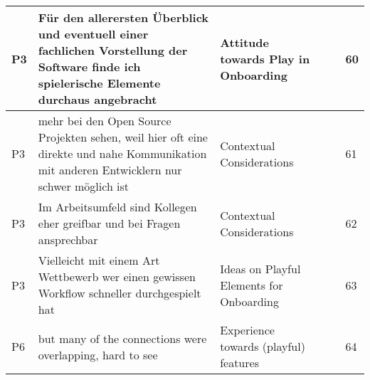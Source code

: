 \begin{appendices}
\begin{landscape}
\begin{longtable}{|p{0.8cm}|p{7cm}|p{3cm}|p{3cm}|p{5.5cm}|p{0.5cm}|}
      P3                   & Für den allerersten Überblick und eventuell einer fachlichen Vorstellung der Software finde ich spielerische Elemente durchaus angebracht                                                                                                                                   & Attitude towards Play in Onboarding      &                                    &                                                                                                                                                    & 60           \\ \hline
      P3                   & mehr bei den Open Source Projekten sehen, weil hier oft eine direkte und nahe Kommunikation mit anderen Entwicklern nur schwer möglich ist                                                                                                                                  & Contextual Considerations                &                                    &                                                                                                                                                    & 61           \\ \hline
      P3                   & Im Arbeitsumfeld sind Kollegen eher greifbar und bei Fragen ansprechbar                                                                                                                                                                                                     & Contextual Considerations                &                                    &                                                                                                                                                    & 62           \\ \hline
      P3                   & Vielleicht mit einem Art Wettbewerb wer einen gewissen Workflow schneller durchgespielt hat                                                                                                                                                                                 & Ideas on Playful Elements for Onboarding &                                    &                                                                                                                                                    & 63           \\ \hline
      P6                   & but many of the connections were overlapping, hard to see                                                                                                                                                                                                                   & Experience towards (playful) features    &                                    &                                                                                                                                                    & 64           \\ \hline

\end{longtable}
\end{landscape}
\end{appendices}
